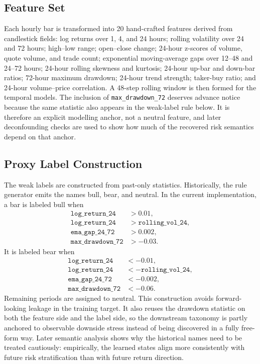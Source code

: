 \documentclass[a4paper,fleqn]{cas-dc}
\begin{document}
\subsection{Feature Set}
Each hourly bar is transformed into 20 hand-crafted features derived from candlestick fields: log returns over 1, 4, and 24 hours; rolling volatility over 24 and 72 hours; high--low range; open--close change; 24-hour z-scores of volume, quote volume, and trade count; exponential moving-average gaps over 12--48 and 24--72 hours; 24-hour rolling skewness and kurtosis; 24-hour up-bar and down-bar ratios; 72-hour maximum drawdown; 24-hour trend strength; taker-buy ratio; and 24-hour volume--price correlation. A 48-step rolling window is then formed for the temporal models. The inclusion of \texttt{max\_drawdown\_72} deserves advance notice because the same statistic also appears in the weak-label rule below. It is therefore an explicit modelling anchor, not a neutral feature, and later deconfounding checks are used to show how much of the recovered risk semantics depend on that anchor.

\subsection{Proxy Label Construction}
The weak labels are constructed from past-only statistics. Historically, the rule generator emits the names bull, bear, and neutral. In the current implementation, a bar is labeled bull when
\begin{align*}
\texttt{log\_return\_24} &> 0.01, \\
\texttt{log\_return\_24} &> \texttt{rolling\_vol\_24}, \\
\texttt{ema\_gap\_24\_72} &> 0.002, \\
\texttt{max\_drawdown\_72} &> -0.03.
\end{align*}
It is labeled bear when
\begin{align*}
\texttt{log\_return\_24} &< -0.01, \\
\texttt{log\_return\_24} &< -\texttt{rolling\_vol\_24}, \\
\texttt{ema\_gap\_24\_72} &< -0.002, \\
\texttt{max\_drawdown\_72} &< -0.06.
\end{align*}
Remaining periods are assigned to neutral. This construction avoids forward-looking leakage in the training target. It also reuses the drawdown statistic on both the feature side and the label side, so the downstream taxonomy is partly anchored to observable downside stress instead of being discovered in a fully free-form way. Later semantic analysis shows why the historical names need to be treated cautiously: empirically, the learned states align more consistently with future risk stratification than with future return direction.
\end{document}
